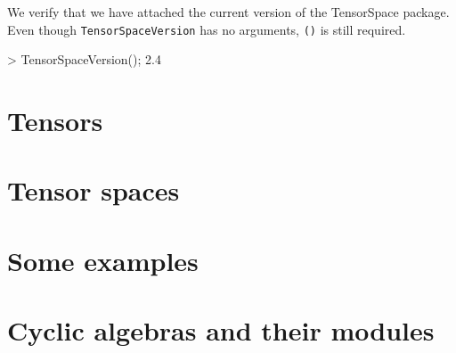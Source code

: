 \documentclass{documentation}
\begin{document}
\begin{example}[Version]
We verify that we have attached the current version of the TensorSpace package.
Even though \texttt{TensorSpaceVersion} has no arguments, \texttt{()} is still required.

\begin{code}
> TensorSpaceVersion();
2.4
\end{code}
\end{example}

\chapter{Tensors}\label{ch:tensors}




\chapter{Tensor spaces}\label{ch:tensor-spaces}



\chapter{Some examples}\label{ch:examples}



\appendix

\chapter{Cyclic algebras and their modules}\label{append:cyclic}



\backmatter
\end{document}
